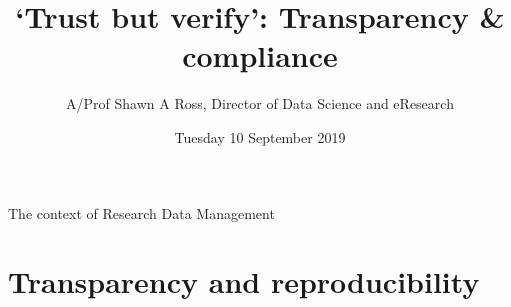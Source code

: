 \documentclass[aspectratio=169, 11pt]{beamer} %
\title{`Trust but verify': Transparency \& compliance} %
\author{A/Prof Shawn A Ross, Director of Data Science and eResearch}               %
\institute{Office of the Deputy Vice-Chancellor (Research)}         %
\date{Tuesday 10 September 2019}                 %
\begin{document}



\maketitle

  

\begin{frame}{The context of Research Data Management}
  \tableofcontents
\end{frame}

%



\section{Transparency and reproducibility}
\end{document}
